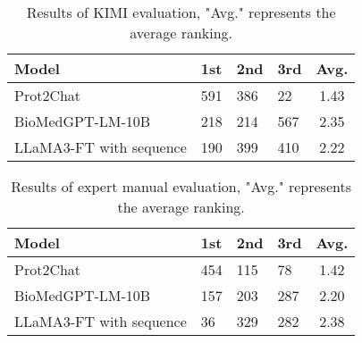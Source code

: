 \begin{table}[!ht]
    \centering
    \renewcommand{\arraystretch}{1.25}
    \begin{tabular}{l|l|l|l|c}
    \hline
        
        Model & 1st & 2nd & 3rd & Avg.  \\ \hline
        Prot2Chat & 591 & 386 & 22 & 1.43  \\ \hline
        BioMedGPT-LM-10B & 218 & 214 & 567 & 2.35  \\ \hline
        LLaMA3-FT with sequence  & 190 & 399 & 410 & 2.22  \\ \hline
    \end{tabular}
    \caption{Results of KIMI evaluation, "Avg." represents the average ranking.}
    \label{tab:select1}
\end{table}


\begin{table}[!ht]
    \centering
    \renewcommand{\arraystretch}{1.25}
    \begin{tabular}{l|l|l|l|c}
    \hline
        Model & 1st & 2nd & 3rd & Avg.  \\ \hline
        Prot2Chat & 454 & 115 & 78 & 1.42  \\ \hline
        BioMedGPT-LM-10B & 157 & 203 & 287 & 2.20  \\ \hline
        LLaMA3-FT with sequence & 36 & 329 & 282 & 2.38  \\ \hline
    \end{tabular}
    \caption{Results of expert manual evaluation, "Avg." represents the average ranking.}
    \label{tab:select2}
\end{table}

